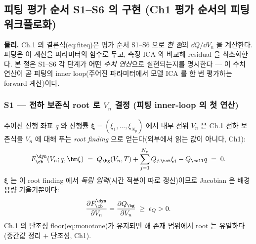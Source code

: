 \subsection{피팅 평가 순서 S1--S6 의 구현 (Ch1 평가 순서의 피팅 워크플로화)}\label{sec:ch6_S}
\textbf{물리.} Ch.1 의 결론식(eq:fiteq)은 평가 순서 S1--S6 으로 \emph{한 점}의 $\dd Q/\dd V_n$ 을 계산한다. 피팅은
이 계산을 파라미터의 함수로 두고, 측정 ICA 와 비교해 residual 을 최소화한다. 본 절은 S1--S6 각 단계가 어떤
\emph{수치 연산}으로 실현되는지를 명시한다 — 이 수치 연산이 곧 피팅의 inner loop(주어진 파라미터에서 모델
ICA 를 한 번 평가하는 forward 계산)이다.

\subsubsection{S1 — 전하 보존식 root 로 $V_n$ 결정 (피팅 inner-loop 의 첫 연산)}\label{sec:ch6_S1}
주어진 진행 좌표 $q$ 와 진행률 $\bm\xi=(\xi_1,\dots,\xi_{N_p})$ 에서 내부 전위 $V_n$ 은 Ch.1 전하 보존식을
$V_n$ 에 대해 푸는 \emph{root finding} 으로 얻는다(외부에서 읽는 값이 아니다, Ch1):
\begin{equation}
F_\cb^\dyn(V_n;q,\bm\xi)\;=\;Q_\bg(V_n,T)+\sum_{j=1}^{N_p}Q_{j,\tot}\xi_j-Q_\cell q\;=\;0.
\label{eq:ch6_dyn_root}
\end{equation}
$\bm\xi$ 는 이 root finding 에서 \emph{독립 입력}(시간 적분이 따로 갱신)이므로 Jacobian 은 배경 용량 기울기뿐이다:
\begin{equation}
\frac{\partial F_\cb^\dyn}{\partial V_n}=\frac{\partial Q_\bg}{\partial V_n}\;\ge\;\epsilon_Q>0.
\label{eq:ch6_dyn_deriv}
\end{equation}
Ch.1 의 단조성 floor(eq:monotone)가 유지되면 해 존재 범위에서 root 는 유일하다(중간값 정리 $+$ 단조성, Ch1).

